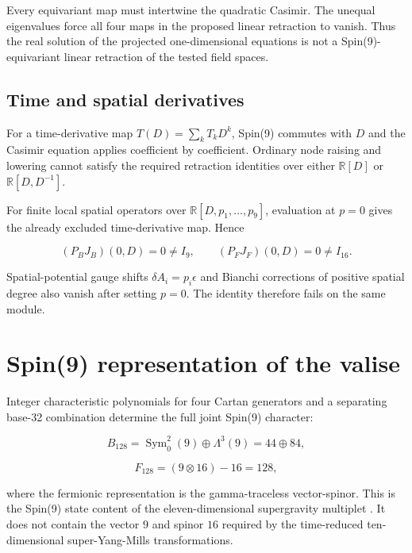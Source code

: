 \documentclass[11pt]{article}
\begin{document}
Every equivariant map must intertwine the quadratic Casimir.  The unequal
eigenvalues force all four maps in the proposed linear retraction to vanish.
Thus the real solution of the projected one-dimensional equations is not a
Spin(9)-equivariant linear retraction of the tested field spaces.

\subsection{Time and spatial derivatives}

For a time-derivative map $T(D)=\sum_k T_kD^k$, Spin(9) commutes with $D$ and
the Casimir equation applies coefficient by coefficient.  Ordinary node
raising and lowering cannot satisfy the required retraction identities over
either $\mathbb R[D]$ or $\mathbb R[D,D^{-1}]$.

For finite local spatial operators over
$\mathbb R[D,p_1,\ldots,p_9]$, evaluation at $p=0$ gives the already excluded
time-derivative map.  Hence

\begin{equation}
(P_BJ_B)(0,D)=0\ne I_9,
\qquad
(P_FJ_F)(0,D)=0\ne I_{16}.
\end{equation}

Spatial-potential gauge shifts $\delta A_i=p_i\epsilon$ and Bianchi corrections
of positive spatial degree also vanish after setting $p=0$.  The identity therefore
fails on the same module.

\section{Spin(9) representation of the valise}

Integer characteristic polynomials for four Cartan generators and a separating
base-32 combination determine the full joint Spin(9) character:

\begin{equation}
B_{128}=\operatorname{Sym}^2_0(9)\oplus\Lambda^3(9)=44\oplus84,
\end{equation}

\begin{equation}
F_{128}=(9\otimes16)-16=128,
\end{equation}

where the fermionic representation is the gamma-traceless vector-spinor.  This is the
Spin(9) state content of the eleven-dimensional supergravity multiplet
\cite{plefka1998}.  It does not contain the vector $9$ and spinor $16$ required
by the time-reduced ten-dimensional super-Yang-Mills transformations.
\end{document}

